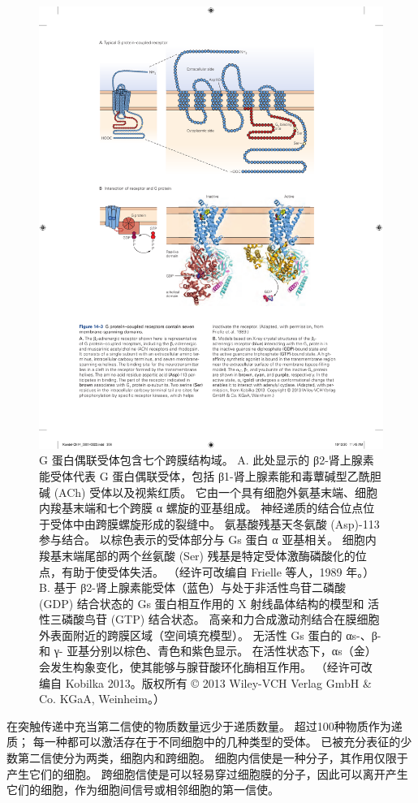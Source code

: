 \begin{figure}[htbp]
	\centering
	\includegraphics[width=0.75\linewidth]{chap14/fig_14_3}
	\caption{G 蛋白偶联受体包含七个跨膜结构域。 A. 此处显示的 β2-肾上腺素能受体代表 G 蛋白偶联受体，包括 β1-肾上腺素能和毒蕈碱型乙酰胆碱 (ACh) 受体以及视紫红质。 它由一个具有细胞外氨基末端、细胞内羧基末端和七个跨膜 α 螺旋的亚基组成。 神经递质的结合位点位于受体中由跨膜螺旋形成的裂缝中。 氨基酸残基天冬氨酸 (Asp)-113 参与结合。 以棕色表示的受体部分与 Gs 蛋白 α 亚基相关。 细胞内羧基末端尾部的两个丝氨酸 (Ser) 残基是特定受体激酶磷酸化的位点，有助于使受体失活。 （经许可改编自 Frielle 等人，1989 年。）B. 基于 β2-肾上腺素能受体（蓝色）与处于非活性鸟苷二磷酸 (GDP) 结合状态的 Gs 蛋白相互作用的 X 射线晶体结构的模型和 活性三磷酸鸟苷 (GTP) 结合状态。 高亲和力合成激动剂结合在膜细胞外表面附近的跨膜区域（空间填充模型）。 无活性 Gs 蛋白的 αs-、β- 和 γ- 亚基分别以棕色、青色和紫色显示。 在活性状态下，αs（金）会发生构象变化，使其能够与腺苷酸环化酶相互作用。 （经许可改编自 Kobilka 2013。版权所有 © 2013 Wiley-VCH Verlag GmbH \& Co. KGaA, Weinheim。）}
	\label{fig:14_3}
\end{figure}


在突触传递中充当第二信使的物质数量远少于递质数量。 超过100种物质作为递质；
每一种都可以激活存在于不同细胞中的几种类型的受体。
已被充分表征的少数第二信使分为两类，细胞内和跨细胞。
细胞内信使是一种分子，其作用仅限于产生它们的细胞。 
跨细胞信使是可以轻易穿过细胞膜的分子，因此可以离开产生它们的细胞，作为细胞间信号或相邻细胞的第一信使。


